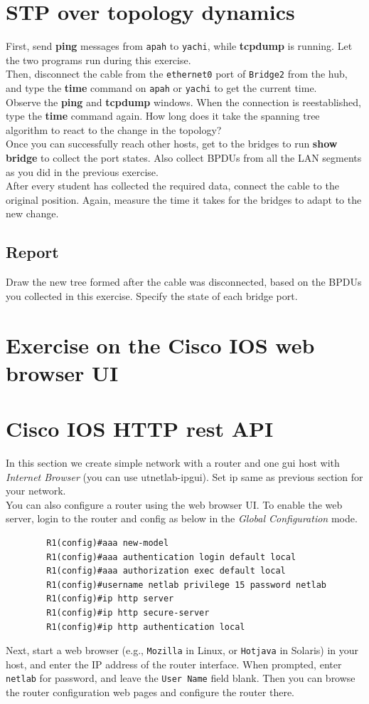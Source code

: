 \documentclass[10pt,a4paper]{article}
\numberwithin{equation}{section}
\numberwithin{figure}{section}
\numberwithin{table}{section}
\begin{document}
\section{STP over topology dynamics}
    First, send \textbf{ping} messages from \texttt{apah} to \texttt{yachi}, while \textbf{tcpdump} is running.
    Let the two programs run during this exercise. \\
    Then, disconnect the cable from the \texttt{ethernet0} port of \texttt{Bridge2} from the hub, and type the \textbf{time} command on \texttt{apah} or \texttt{yachi} to get the current time. \\
    Observe the \textbf{ping} and \textbf{tcpdump} windows. When the connection is reestablished, type the \textbf{time} command again. How long does it take the spanning tree algorithm to react to the change in the topology? \\
    Once you can successfully reach other hosts, get to the bridges to run \textbf{show bridge} to collect the port states. Also collect BPDUs from all the LAN segments as you did in the previous exercise. \\
    After every student has collected the required data, connect the cable to the original position. Again, measure the time it takes for the bridges to adapt to the new change.
    \subsection*{Report}
    Draw the new tree formed after the cable was disconnected, based on the BPDUs you collected in this exercise. Specify the state of each bridge port.

    \section*{Exercise on the Cisco IOS web browser UI}
\section{Cisco IOS HTTP rest API}
    In this section we create simple network with a router and one gui host with \textit{Internet Browser} (you can use utnetlab-ipgui). Set ip same as previous section for your network.\\
    You can also configure a router using the web browser UI. To enable the web server, login to the router and config as below  in the \textit{Global Configuration} mode. \\
    \begin{verbatim}
        R1(config)#aaa new-model
        R1(config)#aaa authentication login default local
        R1(config)#aaa authorization exec default local
        R1(config)#username netlab privilege 15 password netlab
        R1(config)#ip http server
        R1(config)#ip http secure-server
        R1(config)#ip http authentication local
    \end{verbatim}
    Next, start a web browser (e.g., \texttt{Mozilla} in Linux, or \texttt{Hotjava} in Solaris) in your host, and enter the IP address of the router interface. When prompted, enter \texttt{netlab} for password, and leave the \texttt{User Name} field blank. Then you can browse the router configuration web pages and configure the router there.
\end{document}
